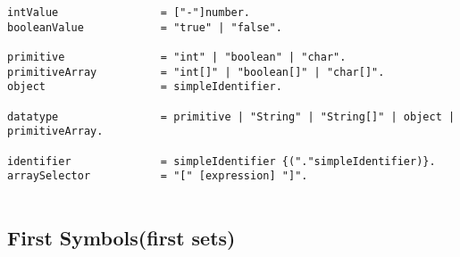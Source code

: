 \begin{verbatim}
intValue                = ["-"]number.
booleanValue            = "true" | "false".

primitive               = "int" | "boolean" | "char".
primitiveArray          = "int[]" | "boolean[]" | "char[]".
object                  = simpleIdentifier.

datatype                = primitive | "String" | "String[]" | object | primitiveArray.

identifier              = simpleIdentifier {("."simpleIdentifier)}.
arraySelector           = "[" [expression] "]".


\end{verbatim}


\subsection{First Symbols(first sets)}
\label{first_sets}
\noindent
